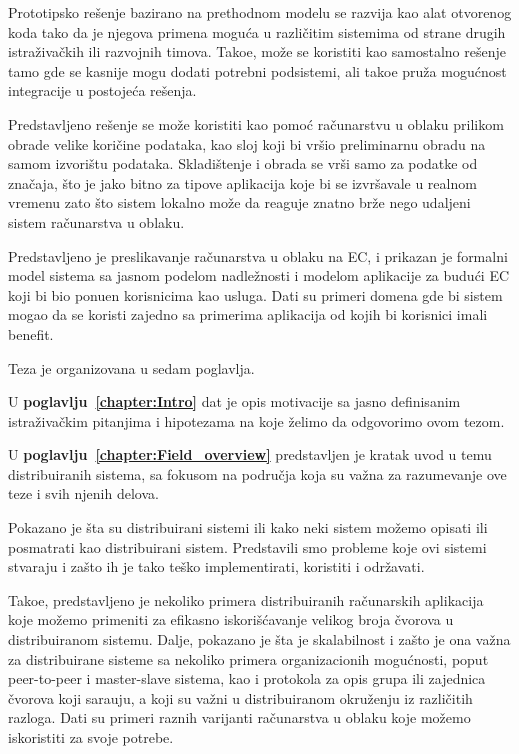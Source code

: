 Prototipsko re\v senje bazirano na prethodnom modelu se razvija kao alat otvorenog koda tako da je njegova primena mogu\'ca u razli\v citim sistemima od strane drugih istra\v ziva\v ckih ili razvojnih timova. Tako\dj e, mo\v ze se koristiti kao samostalno re\v senje tamo gde se kasnije mogu dodati potrebni podsistemi, ali tako\dj e pru\v za mogu\'cnost integracije u postoje\'ca re\v senja.

Predstavljeno re\v senje se mo\v ze koristiti kao pomo\'c ra\v cunarstvu u oblaku prilikom obrade velike kori\v cine podataka, kao sloj koji bi vr\v sio preliminarnu obradu na samom izvori\v stu podataka. Skladi\v stenje i obrada se vr\v si samo za podatke od zna\v caja, \v sto je jako bitno za tipove aplikacija koje bi se izvr\v savale u realnom vremenu zato \v sto sistem lokalno mo\v ze da reaguje znatno br\v ze nego udaljeni sistem ra\v cunarstva u oblaku.

Predstavljeno je preslikavanje ra\v cunarstva u oblaku na EC, i prikazan je formalni model sistema sa jasnom podelom nadle\v znosti i modelom aplikacije za budu\'ci EC koji bi bio ponu\dj en korisnicima kao usluga. Dati su primeri domena gde bi sistem mogao da se koristi zajedno sa primerima aplikacija od kojih bi korisnici imali benefit. 

\noindent
Teza je organizovana u sedam poglavlja.

U \textbf{poglavlju~\ref{chapter:Intro}} dat je opis motivacije sa jasno definisanim istra\v ziva\v ckim pitanjima i hipotezama na koje \v zelimo da odgovorimo ovom tezom.

U \textbf{poglavlju~\ref{chapter:Field_overview}} predstavljen je kratak uvod u temu distribuiranih sistema, sa fokusom na podru\v cja koja su va\v zna za razumevanje ove teze i svih njenih delova.

Pokazano je \v sta su distribuirani sistemi ili kako neki sistem mo\v zemo opisati ili posmatrati kao distribuirani sistem. Predstavili smo probleme koje ovi sistemi stvaraju i za\v sto ih je tako te\v sko implementirati, koristiti i odr\v zavati.

Tako\dj e, predstavljeno je nekoliko primera distribuiranih ra\v cunarskih aplikacija koje mo\v zemo primeniti za efikasno iskori\v s\'cavanje velikog broja \v cvorova u distribuiranom sistemu. Dalje, pokazano je \v sta je skalabilnost i za\v sto je ona va\v zna za distribuirane sisteme sa nekoliko primera organizacionih mogu\'cnosti, poput peer-to-peer i master-slave sistema, kao i protokola za opis grupa ili zajednica \v cvorova koji sara\dj uju, a koji su va\v zni u distribuiranom okru\v zenju iz razli\v citih razloga. Dati su primeri raznih varijanti ra\v cunarstva u oblaku koje mo\v zemo iskoristiti za svoje potrebe.

